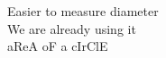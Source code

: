 \documentclass[preview]{standalone}
\begin{document}
Easier to measure diameter\\We are already using it\\aReA oF a cIrClE\\
\end{document}
